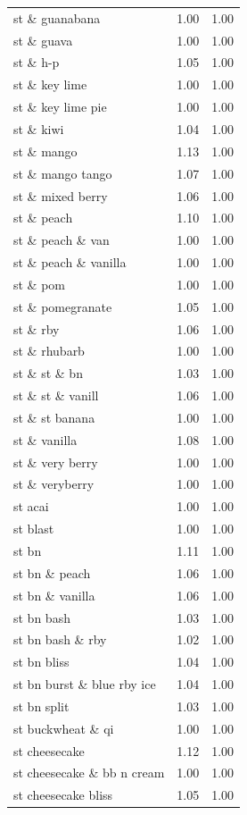 \begin{table}
\begin{tabular}{lrr}
st \& guanabana & 1.00 & 1.00 \\
st \& guava & 1.00 & 1.00 \\
st \& h-p & 1.05 & 1.00 \\
st \& key lime & 1.00 & 1.00 \\
st \& key lime pie & 1.00 & 1.00 \\
st \& kiwi & 1.04 & 1.00 \\
st \& mango & 1.13 & 1.00 \\
st \& mango tango & 1.07 & 1.00 \\
st \& mixed berry & 1.06 & 1.00 \\
st \& peach & 1.10 & 1.00 \\
st \& peach \& van & 1.00 & 1.00 \\
st \& peach \& vanilla & 1.00 & 1.00 \\
st \& pom & 1.00 & 1.00 \\
st \& pomegranate & 1.05 & 1.00 \\
st \& rby & 1.06 & 1.00 \\
st \& rhubarb & 1.00 & 1.00 \\
st \& st \& bn & 1.03 & 1.00 \\
st \& st \& vanill & 1.06 & 1.00 \\
st \& st banana & 1.00 & 1.00 \\
st \& vanilla & 1.08 & 1.00 \\
st \& very berry & 1.00 & 1.00 \\
st \& veryberry & 1.00 & 1.00 \\
st acai & 1.00 & 1.00 \\
st blast & 1.00 & 1.00 \\
st bn & 1.11 & 1.00 \\
st bn \& peach & 1.06 & 1.00 \\
st bn \& vanilla & 1.06 & 1.00 \\
st bn bash & 1.03 & 1.00 \\
st bn bash \& rby & 1.02 & 1.00 \\
st bn bliss & 1.04 & 1.00 \\
st bn burst \& blue rby ice & 1.04 & 1.00 \\
st bn split & 1.03 & 1.00 \\
st buckwheat \& qi & 1.00 & 1.00 \\
st cheesecake & 1.12 & 1.00 \\
st cheesecake \& bb n cream & 1.00 & 1.00 \\
st cheesecake bliss & 1.05 & 1.00 \\

\end{tabular}
\end{table}
